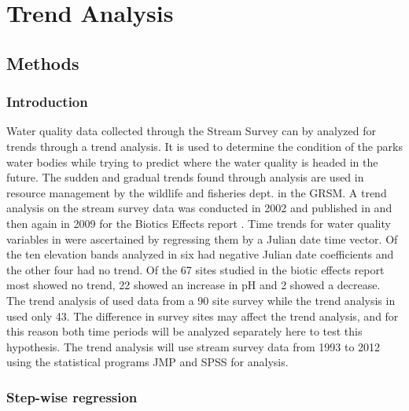 \chapter{Trend Analysis}\label{ch:TA}

\section{Methods}

\subsection{Introduction}

Water quality data collected through the Stream Survey can by analyzed for trends through a trend analysis.
It is used to determine the condition of the parks water bodies while trying to predict where the water quality is headed in the future. 
The sudden and gradual trends found through analysis are used in resource management by the wildlife and fisheries dept. in the GRSM.
A trend analysis on the stream survey data was conducted in 2002 and published in \citet{robinson2008ph} and then again in 2009 for the Biotics Effects report \citep{cai2012}.
Time trends for water quality variables  in \citet{robinson2008ph} were ascertained by regressing them by a Julian date time vector.
Of the ten elevation bands analyzed in \citet{robinson2008ph} six had negative Julian date coefficients and the other four had no trend. 
Of the 67 sites studied in the biotic effects report most showed no trend, 22 showed an increase in pH and 2 showed a decrease\citep{cai2012}. 
The trend analysis of \citet{robinson2008ph} used data from a 90 site survey while the trend analysis in \citet{cai2012} used only 43.
The difference in survey sites may affect the trend analysis, and for this reason both time periods will be analyzed separately here to test this hypothesis.
The trend analysis will use stream survey data from 1993 to 2012 using the statistical programs JMP and SPSS for analysis.

\subsection{Step-wise regression}

